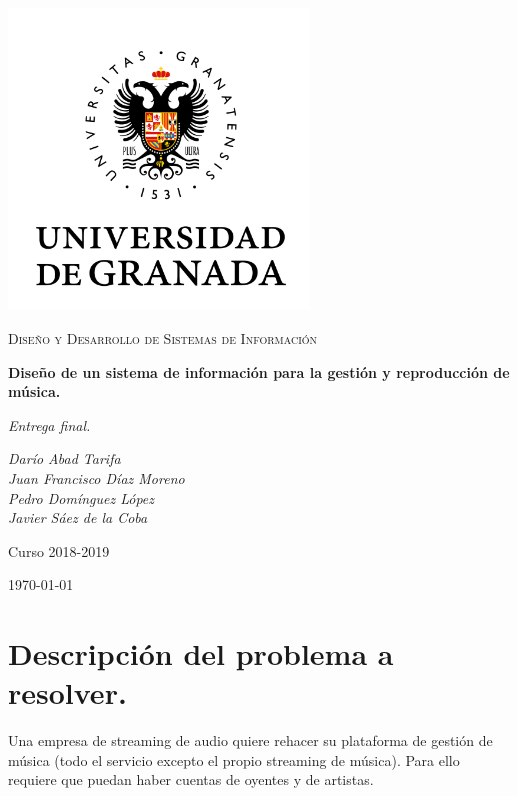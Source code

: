 \documentclass[12pt,a4paper]{article}
\begin{document}
\begin{titlepage}
  \centering
  \includegraphics[width=0.6\textwidth]{imagenes/ugr.png}\par\vspace{1cm}
  {\scshape\large Diseño y Desarrollo de Sistemas de Información \par} \vspace{1cm}
  {\huge\bfseries Diseño de un sistema de información para la gestión y reproducción de música. \par}
  \vspace{0.4cm}
  {\large\itshape Entrega final.}
  \vspace{0.6cm}
  {\large\itshape  Darío Abad Tarifa \\ Juan Francisco Díaz Moreno \\ Pedro Domínguez López \\ Javier Sáez de la Coba \par} \vspace{1.00cm}
  Curso 2018-2019 \\
  \vfill

  {\large \today\par}
\end{titlepage}

\tableofcontents
\newpage

\setlength{\parskip}{10pt}

\section{Descripción del problema a resolver.}

Una empresa de streaming de audio quiere rehacer su plataforma de gestión de música (todo el servicio excepto el propio streaming de música). Para ello requiere que puedan haber cuentas de oyentes y de artistas.
\end{document}
